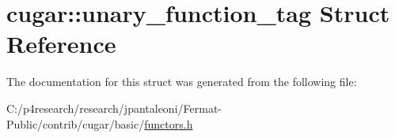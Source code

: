 \hypertarget{structcugar_1_1unary__function__tag}{}\section{cugar\+:\+:unary\+\_\+function\+\_\+tag Struct Reference}
\label{structcugar_1_1unary__function__tag}


The documentation for this struct was generated from the following file\+:\begin{DoxyCompactItemize}
\item 
C\+:/p4research/research/jpantaleoni/\+Fermat-\/\+Public/contrib/cugar/basic/\hyperlink{functors_8h}{functors.\+h}\end{DoxyCompactItemize}
